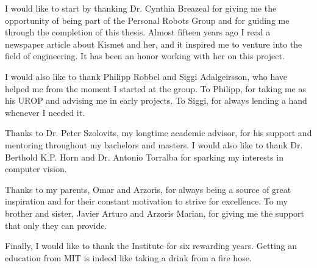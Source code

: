 I would like to start by thanking Dr. Cynthia Breazeal for giving me the opportunity of being part of the Personal 
Robots Group and for guiding me through the completion of this thesis.  Almost fifteen years ago I read a 
newspaper article about Kismet and her, and it inspired me to venture into the field of engineering.  It has been 
an honor working with her on this project.

I would also like to thank Philipp Robbel and Siggi Adalgeirsson, who have helped me from the moment I 
started at the group.  To Philipp, for taking me as his UROP and advising me in early projects.  To Siggi, for 
always lending a hand whenever I needed it.

Thanks to Dr. Peter Szolovits, my longtime academic advisor, for his support and mentoring throughout my 
bachelors and masters. I would also like to thank Dr. Berthold K.P. Horn and Dr. Antonio Torralba for sparking 
my interests in computer vision.

Thanks to my parents, Omar and Arzoris, for always being a source of great inspiration and for their constant 
motivation to strive for excellence.  To my brother and sister, Javier Arturo and Arzoris Marian, for giving me the 
support that only they can provide.

Finally, I would like to thank the Institute for six rewarding years. Getting an education from MIT is indeed like 
taking a drink from a fire hose.
